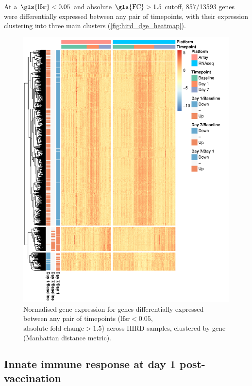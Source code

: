 At a $\text{\gls{lfsr}} < 0.05$ and absolute $\text{\gls{FC}} > 1.5$ cutoff, 857/13593 genes were differentially expressed between any pair of timepoints, with their expression clustering into three main clusters (\autoref{fig:hird_dge_heatmap}).
 
\begin{figure}
    \includegraphics[width=1.0\textwidth]{mainmatter/figures/chapter_02/plot_dge_eqtl.heatmap_dge.pdf}
    \caption{Normalised gene expression for genes differentially expressed between any pair of timepoints ($\text{lfsr} < 0.05$, $\text{absolute fold change} > 1.5$) across \gls{HIRD} samples, clustered by gene (Manhattan distance metric).}
    \label{fig:hird_dge_heatmap}
\end{figure}

\subsection{Innate immune response at day 1 post-vaccination}

